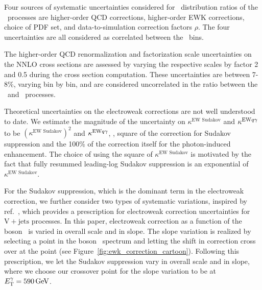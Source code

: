 Four sources of systematic uncertainties considered for \ETg\ distribution ratios of the \vg\ processes are higher-order QCD corrections, higher-order EWK corrections, choice of PDF set, and data-to-simulation correction factors $\rho$. 
The four uncertainties are all considered as correlated between the \ETg\ bins.

The higher-order QCD renormalization and factorization scale uncertainties on the NNLO cross sections are assessed by varying the respective scales by factor 2 and 0.5 during the cross section computation. 
These uncertainties are between 7-8\%, varying bin by bin, and are considered uncorrelated in the ratio between the \zinvg\ and \wlng\ processes.

Theoretical uncertainties on the electroweak corrections are not well understood to date.  
We estimate the magnitude of the uncertainty on $\kappa^{\text{EW Sudakov}}$ and $\kappa^{\text{EW} {q}\gamma}$ to be $(\kappa^{\text{EW Sudakov}})^2$ and $\kappa^{\text{EW} {q}\gamma}$, \ie, square of the correction for Sudakov suppression and the 100\% of the correction itself for the photon-induced enhancement. 
The choice of using the square of $\kappa^{\text{EW Sudakov}}$ is motivated by the fact that fully resummed leading-log Sudakov suppression is an exponential of $\kappa^{\text{EW Sudakov}}$.

For the Sudakov suppression, which is the dominant term in the electroweak correction, we further consider two types of systematic variations, inspired by ref.~\cite{Lindert:2017olm}, which provides a prescription for electroweak correction uncertainties for $\mathrm{V}+\text{jets}$ processes. 
In this paper, electroweak correction as a function of the boson \pt\ is varied in overall scale and in slope. 
The slope variation is realized by selecting a point in the boson \pt\ spectrum and letting the shift in correction cross over at the point (see Figure~\ref{fig:ewk_correction_cartoon}). 
Following this prescription, we let the Sudakov suppression vary in overall scale and in slope, where we choose our crossover point for the slope variation to be at $E_{\mathrm{T}}^{\gamma}=590\,\text{Ge\hspace{-.08em}V}$.

